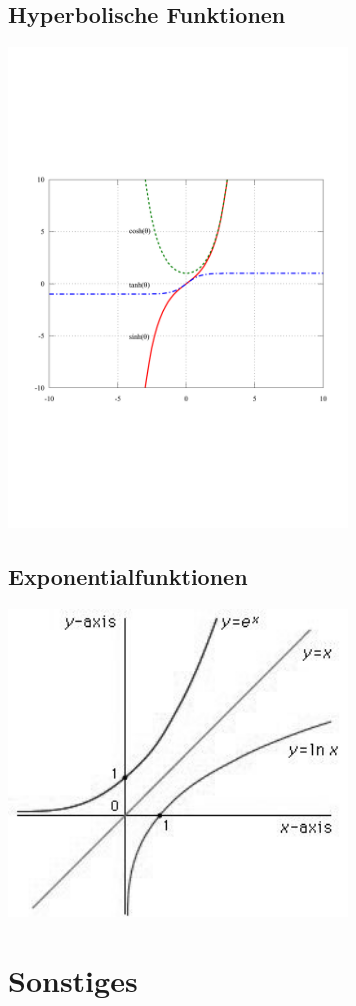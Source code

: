 \documentclass[a4paper]{article}
\begin{document}
\begin{appendix}
\begin{multicols}{2}
			\subsection{Hyperbolische Funktionen}
				\includegraphics[width=9cm]{Sinh_cosh_tanh.pdf}
			\subsection{Exponentialfunktionen}
				\includegraphics[width=9cm]{ex_ln}
		\end{multicols}

\section{Sonstiges}
	\begin{fmerke}[Partialbruchzerlegung]

\end{fmerke}
\end{appendix}
\end{document}
